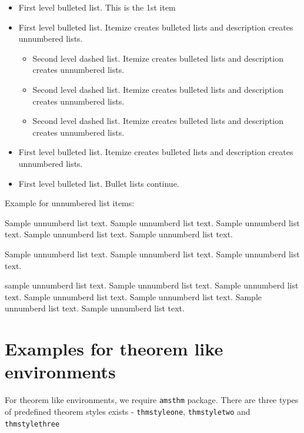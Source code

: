 \documentclass[unnumsec,webpdf,contemporary,large]{oup-authoring-template}%
\theoremstyle{thmstyleone}%
\theoremstyle{thmstyletwo}%
\theoremstyle{thmstylethree}%
\begin{document}
\begin{itemize}
\item First level bulleted list. This is the 1st item

\item First level bulleted list. Itemize creates bulleted lists and description creates unnumbered lists.
\begin{itemize}
\item Second level dashed list. Itemize creates bulleted lists and description creates unnumbered lists.

\item Second level dashed list. Itemize creates bulleted lists and description creates unnumbered lists.

\item Second level dashed list. Itemize creates bulleted lists and description creates unnumbered lists.
\end{itemize}

\item First level bulleted list. Itemize creates bulleted lists and description creates unnumbered lists.

\item First level bulleted list. Bullet lists continue.
\end{itemize}

\noindent
Example for unnumbered list items:

\begin{unlist}
\item Sample unnumberd list text. Sample unnumberd list text. Sample unnumberd list text. Sample unnumberd list text. Sample unnumberd list text.

\item Sample unnumberd list text. Sample unnumberd list text. Sample unnumberd list text.

\item sample unnumberd list text. Sample unnumberd list text. Sample unnumberd list text. Sample unnumberd list text. Sample unnumberd list text. Sample unnumberd list text. Sample unnumberd list text.
\end{unlist}

\section{Examples for theorem like environments}\label{sec10}

For theorem like environments, we require \verb+amsthm+ package. There are three types of predefined theorem styles
exists - \verb+thmstyleone+, \verb+thmstyletwo+ and \verb+thmstylethree+
\end{document}
